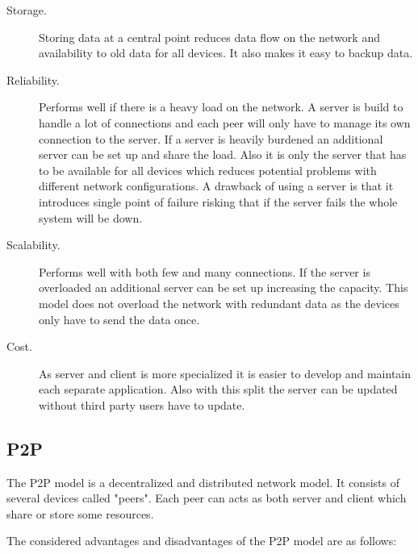 \begin{description}
\item[Storage.] Storing data at a central point reduces data flow on the network and availability to old data for all devices. It also makes it easy to backup data.

\item[Reliability.] Performs well if there is a heavy load on the network. A server is build to handle a lot of connections and each peer will only have to manage its own connection to the server. If a server is heavily burdened an additional server can be set up and share the load. Also it is only the server that has to be available for all devices which reduces potential problems with different network configurations. A drawback of using a server is that it introduces single point of failure risking that if the server fails the whole system will be down.

\item[Scalability.] Performs well with both few and many connections. If the server is overloaded an additional server can be set up increasing the capacity. This model does not overload the network with redundant data as the devices only have to send the data once.

\item[Cost.] As server and client is more specialized it is easier to develop and maintain each separate application. Also with this split the server can be updated without third party users have to update.
\end{description}

\subsection{P2P}
The P2P model is a decentralized and distributed network model. It consists of several devices called "peers". Each peer can acts as both server and client which share or store some resources.

The considered advantages and disadvantages of the P2P model are as follows:

